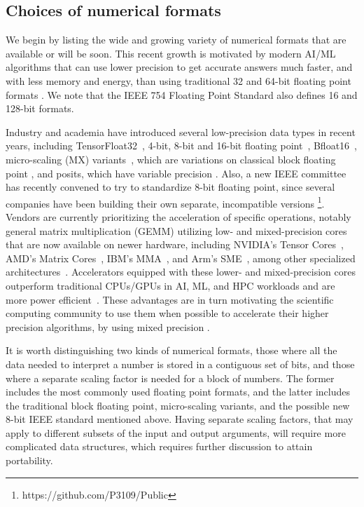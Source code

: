 \documentclass{article}
\begin{document}
\subsection{Choices of numerical formats}

We begin by listing the wide and growing variety of
numerical formats that are available or will be soon.
This recent growth is motivated by modern AI/ML algorithms
that can use lower precision to get accurate answers much
faster, and with less memory and energy, than using 
traditional 32 and 64-bit floating point formats \cite{IEEE754}. We note that the IEEE 754 Floating Point Standard \cite{IEEE754} also defines 16 and 128-bit formats.

Industry and academia have introduced several low-precision data types in recent years, including TensorFloat32~\cite{ampere}, 4-bit, 8-bit and 16-bit floating point~\cite{micikevicius2022fp8}, Bfloat16~\cite{wang2019bfloat16}, micro-scaling (MX) variants~\cite{rouhani2023microscaling}, which are variations
on classical block floating point \cite{Wilkinson63},
and posits, which have variable precision \cite{Posits,GoodBadUgly}.
Also, a new IEEE committee has recently convened to try to
standardize 8-bit floating point, since several companies
have been building their own separate, incompatible versions \footnote{https://github.com/P3109/Public}.
Vendors are currently prioritizing the acceleration of specific operations, notably general matrix multiplication (GEMM) utilizing low- and mixed-precision cores that are now available on newer hardware, including NVIDIA's Tensor Cores~\cite{ampere}, 
AMD's Matrix Cores~\cite{amd}, IBM's MMA~\cite{starke2021ibm},
and Arm's SME~\cite{sme}, among other specialized architectures~\cite{NorriePYKLLYJP21,cerebras}.
Accelerators equipped with these lower- and mixed-precision cores outperform traditional CPUs/GPUs in AI, ML, and HPC workloads and are more power efficient~\cite{Atoofian23}.
These advantages are in turn motivating the scientific
computing community to use them when possible to accelerate
their higher precision algorithms, by using mixed precision
\cite{higham2022mixed, haidar2020mixed}.

It is worth distinguishing two kinds of numerical formats,
those where all the data needed to interpret a number
is stored in a contiguous set of bits, and those where a
separate scaling factor is needed for a block of numbers.
The former includes the most commonly used floating point formats,
and the latter includes the traditional block floating point, 
micro-scaling variants, and the possible new 8-bit IEEE standard
mentioned above. Having separate scaling factors,
that may apply to different subsets of the input
and output arguments,
will require more complicated data structures, which
requires further discussion to attain portability.
\end{document}
